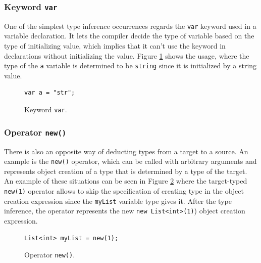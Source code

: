 \subsubsection*{Keyword \texttt{var}}
One of the simplest type inference occurrences regards the \texttt{var} keyword used in a variable declaration.
It lets the compiler decide the type of variable based on the type of initializing value, which implies that it can’t use the keyword in declarations without initializing the value.
Figure \ref{img07:var} shows the usage, where the type of the \texttt{a} variable is determined to be \texttt{string} since it is initialized by a string value. 
\begin{figure}[h]
\begin{lstlisting}[style=csharp]
var a = "str";
\end{lstlisting}
\caption{Keyword \texttt{var}.}
\label{img07:var}
\end{figure}

\subsubsection*{Operator \texttt{new()}}
There is also an opposite way of deducting types from a target to a source.
An example is the \texttt{new()} operator, which can be called with arbitrary arguments and represents object creation of a type that is determined by a type of the target. 
An example of these situations can be seen in Figure \ref{img08:new} where the target-typed \texttt{new(1)} operator allows to skip the specification of creating type in the object creation expression since the \texttt{myList} variable type gives it. After the type inference, the operator represents the new \texttt{new List<int>(1)}) object creation expression.
\begin{figure}[h]
\begin{lstlisting}[style=csharp]
List<int> myList = new(1);
\end{lstlisting}
\caption{Operator \texttt{new()}.}
\label{img08:new}
\end{figure}

